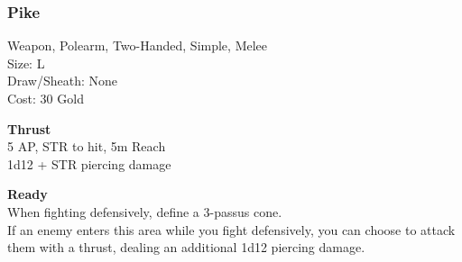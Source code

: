 \subsubsection{Pike}\label{weapon:pike}
Weapon, Polearm, Two-Handed, Simple, Melee\\
Size: L\\
Draw/Sheath: None\\
Cost: 30 Gold

\textbf{Thrust}\\
5 AP, STR to hit, 5m Reach\\
1d12 + \texttimes STR piercing damage

\textbf{Ready}\\
When fighting defensively, define a 3-passus cone.\\
If an enemy enters this area while you fight defensively, you can choose to attack them with a thrust, dealing an additional 1d12 piercing damage.\\

